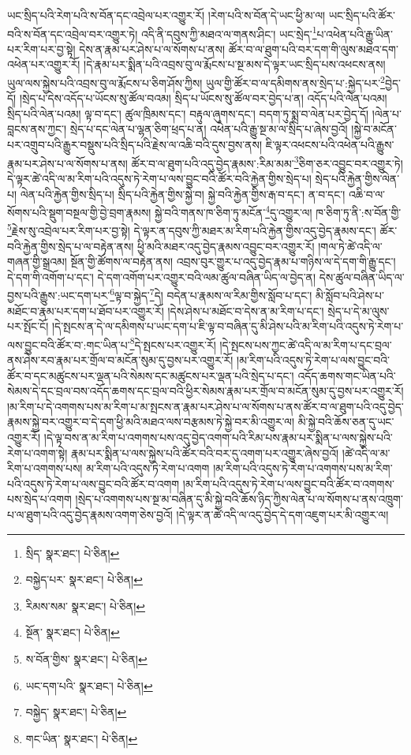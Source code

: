 ཡང་སྲིད་པའི་རེག་པའི་ས་བོན་དང་འབྲེལ་པར་འགྱུར་རོ། །རེག་པའི་ས་བོན་དེ་ཡང་ཕྱི་མ་ལ། ཡང་སྲིད་པའི་ཚོར་བའི་ས་བོན་དང་འབྲེལ་བར་འགྱུར་ཏེ། འདི་ནི་དབུས་ཀྱི་མཐའ་ལ་གནས་ཤིང་། ཡང་སྲེད་\footnote{སྲིད་  སྣར་ཐང་།  པེ་ཅིན། }པ་འཕེན་པའི་རྒྱུ་ཡིན་པར་རིག་པར་བྱ་སྟེ། དེས་ན་རྣམ་པར་ཤེས་པ་ལ་སོགས་པ་ནས། ཚོར་བ་ལ་ཐུག་པའི་བར་དག་གི་ལུས་མཐའ་དག་འཕེན་པར་འགྱུར་རོ། །དེ་རྣམ་པར་སྨིན་པའི་འབྲས་བུ་ལ་རྨོངས་པ་སྔ་མས་དེ་ལྟར་ཡང་སྲིད་པས་འཕངས་ནས། ཡུལ་ལས་སྐྱེས་པའི་འབྲས་བུ་ལ་རྨོངས་པ་ཅིག་ཤོས་ཀྱིས། ཡུལ་གྱི་ཚོར་བ་ལ་དམིགས་ནས་སྲེད་པ་:སྐྱེད་པར་\footnote{བསྐྱེད་པར་  སྣར་ཐང་།  པེ་ཅིན། }བྱེད་དོ། །སྲེད་པ་དེས་འདོད་པ་ཡོངས་སུ་ཚོལ་བའམ། སྲིད་པ་ཡོངས་སུ་ཚོལ་བར་བྱེད་པ་ན། འདོད་པའི་ལེན་པའམ། སྲིད་པའི་ལེན་པའམ། ལྟ་བ་དང་། ཚུལ་ཁྲིམས་དང་། བརྟུལ་ཞུགས་དང་། བདག་ཏུ་སྨྲ་བ་ལེན་པར་བྱེད་དོ། །ལེན་པ་བླངས་ནས་ཀྱང་། སྲེད་པ་དང་ལེན་པ་ལྷན་ཅིག་ཕྲད་པ་ན། འཕེན་པའི་རྒྱུ་སྔ་མ་ལ་སྲིད་པ་ཞེས་བྱའོ། །སྐྱེ་བ་མངོན་པར་འགྲུབ་པའི་རྒྱུར་བསྡུས་པའི་སྲིད་པའི་རྗེས་ལ་འཆི་བའི་དུས་བྱས་ནས། ཇི་ལྟར་འཕངས་པའི་འཕེན་པའི་རྒྱུས་རྣམ་པར་ཤེས་པ་ལ་སོགས་པ་ནས། ཚོར་བ་ལ་ཐུག་པའི་འདུ་བྱེད་རྣམས་:རིམ་མམ་\footnote{རིམས་སམ་  སྣར་ཐང་།  པེ་ཅིན། }ཅིག་ཅར་འབྱུང་བར་འགྱུར་ཏེ། དེ་ལྟར་ཚེ་འདི་ལ་མ་རིག་པའི་འདུས་ཏེ་རེག་པ་ལས་བྱུང་བའི་ཚོར་བའི་རྐྱེན་གྱིས་སྲེད་པ། སྲེད་པའི་རྐྱེན་གྱིས་ལེན་པ། ལེན་པའི་རྐྱེན་གྱིས་སྲིད་པ། སྲིད་པའི་རྐྱེན་གྱིས་སྐྱེ་བ། སྐྱེ་བའི་རྐྱེན་གྱིས་རྒ་བ་དང་། ན་བ་དང་། འཆི་བ་ལ་སོགས་པའི་སྡུག་བསྔལ་གྱི་བྱེ་བྲག་རྣམས། སྐྱེ་བའི་གནས་ཁ་ཅིག་ཏུ་མངོན་\footnote{སྔོན་  སྣར་ཐང་།  པེ་ཅིན། }དུ་འགྱུར་ལ། ཁ་ཅིག་ཏུ་ནི་:ས་བོན་གྱི་\footnote{ས་བོན་གྱིས་  སྣར་ཐང་།  པེ་ཅིན། }རྗེས་སུ་འབྲེལ་པར་རིག་པར་བྱ་སྟེ། དེ་ལྟར་ན་དབུས་ཀྱི་མཐར་མ་རིག་པའི་རྐྱེན་གྱིས་འདུ་བྱེད་རྣམས་དང་། ཚོར་བའི་རྐྱེན་གྱིས་སྲེད་པ་ལ་བརྟེན་ནས། ཕྱི་མའི་མཐར་འདུ་བྱེད་རྣམས་འབྱུང་བར་འགྱུར་རོ། །གལ་ཏེ་ཚེ་འདི་ལ་གཞན་གྱི་སྒྲའམ། སྔོན་གྱི་ཚོགས་ལ་བརྟེན་ནས། འབྲས་བུར་གྱུར་པ་འདུ་བྱེད་རྣམ་པ་གཉིས་ལ་དེ་དག་གི་རྒྱུ་དང་། དེ་དག་གི་འགོག་པ་དང་། དེ་དག་འགོག་པར་འགྱུར་བའི་ལམ་ཚུལ་བཞིན་ཡིད་ལ་བྱེད་ན། དེས་ཚུལ་བཞིན་ཡིད་ལ་བྱས་པའི་རྒྱུས་:ཡང་དག་པར་\footnote{ཡང་དག་པའི་  སྣར་ཐང་།  པེ་ཅིན། }ལྟ་བ་སྐྱེད་\footnote{བསྐྱེད་  སྣར་ཐང་།  པེ་ཅིན། }དེ། བདེན་པ་རྣམས་ལ་རིམ་གྱིས་སློབ་པ་དང་། མི་སློབ་པའི་ཤེས་པ་མཐོང་བ་རྣམ་པར་དག་པ་ཐོབ་པར་འགྱུར་རོ། །དེས་ཤེས་པ་མཐོང་བ་དེས་ན་མ་རིག་པ་དང་། སྲེད་པ་དེ་མ་ལུས་པར་སྤོང་ངོ། །དེ་སྤངས་ན་དེ་ལ་དམིགས་པ་ཡང་དག་པ་ཇི་ལྟ་བ་བཞིན་དུ་མི་ཤེས་པའི་མ་རིག་པའི་འདུས་ཏེ་རེག་པ་ལས་བྱུང་བའི་ཚོར་བ་:གང་ཡིན་པ་\footnote{གང་ཡིན་  སྣར་ཐང་།  པེ་ཅིན། }དེ་སྤངས་པར་འགྱུར་རོ། །དེ་སྤངས་པས་ཀྱང་ཚེ་འདི་ལ་མ་རིག་པ་དང་བྲལ་ནས་ཤེས་རབ་རྣམ་པར་གྲོལ་བ་མངོན་སུམ་དུ་བྱས་པར་འགྱུར་རོ། །མ་རིག་པའི་འདུས་ཏེ་རེག་པ་ལས་བྱུང་བའི་ཚོར་བ་དང་མཚུངས་པར་ལྡན་པའི་སེམས་དང་མཚུངས་པར་ལྡན་པའི་སྲེད་པ་དང་། འདོད་ཆགས་གང་ཡིན་པའི་སེམས་དེ་དང་བྲལ་བས་འདོད་ཆགས་དང་བྲལ་བའི་ཕྱིར་སེམས་རྣམ་པར་གྲོལ་བ་མངོན་སུམ་དུ་བྱས་པར་འགྱུར་རོ། །མ་རིག་པ་དེ་འགགས་པས་མ་རིག་པ་མ་སྤངས་ན་རྣམ་པར་ཤེས་པ་ལ་སོགས་པ་ནས་ཚོར་བ་ལ་ཐུག་པའི་འདུ་བྱེད་རྣམས་སྐྱེ་བར་འགྱུར་བ་དེ་དག་ཕྱི་མའི་མཐའ་ལས་བརྩམས་ཏེ་སྐྱེ་བར་མི་འགྱུར་ལ། མི་སྐྱེ་བའི་ཆོས་ཅན་དུ་ཡང་འགྱུར་རོ། །དེ་ལྟ་བས་ན་མ་རིག་པ་འགགས་པས་འདུ་བྱེད་འགག་པའི་རིམ་པས་རྣམ་པར་སྨིན་པ་ལས་སྐྱེས་པའི་རེག་པ་འགག་སྟེ། རྣམ་པར་སྨིན་པ་ལས་སྐྱེས་པའི་ཚོར་བའི་བར་དུ་འགག་པར་འགྱུར་ཞེས་བྱའོ། །ཚེ་འདི་ལ་མ་རིག་པ་འགགས་པས། མ་རིག་པའི་འདུས་ཏེ་རེག་པ་འགག །མ་རིག་པའི་འདུས་ཏེ་རེག་པ་འགགས་པས་མ་རིག་པའི་འདུས་ཏེ་རེག་པ་ལས་བྱུང་བའི་ཚོར་བ་འགག །མ་རིག་པའི་འདུས་ཏེ་རེག་པ་ལས་བྱུང་བའི་ཚོར་བ་འགགས་པས་སྲེད་པ་འགག །སྲེད་པ་འགགས་པས་སྔ་མ་བཞིན་དུ་མི་སྐྱེ་བའི་ཆོས་ཉིད་ཀྱིས་ལེན་པ་ལ་སོགས་པ་ནས་འཁྲུག་པ་ལ་ཐུག་པའི་འདུ་བྱེད་རྣམས་འགག་ཅེས་བྱའོ། །དེ་ལྟར་ན་ཚེ་འདི་ལ་འདུ་བྱེད་དེ་དག་འཇུག་པར་མི་འགྱུར་ལ། 